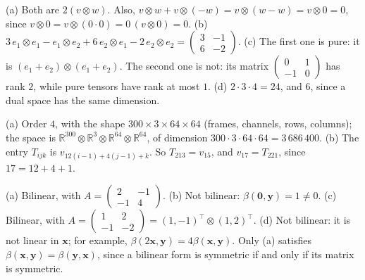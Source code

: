 \documentclass[11pt]{article}
\begin{document}
\begin{description}[leftmargin=0pt, itemsep=0.3em]
    \item[\ref{pr:tensor-rules}.] (a) Both are $2(v \otimes w)$. Also, $v \otimes w + v \otimes (-w) = v \otimes (w - w) = v \otimes 0 = 0$, since $v \otimes 0 = v \otimes (0 \cdot 0) = 0\,(v \otimes 0) = 0$. (b) $3\, e_1 \otimes e_1 - e_1 \otimes e_2 + 6\, e_2 \otimes e_1 - 2\, e_2 \otimes e_2 = \left(\begin{smallmatrix} 3 & -1 \\ 6 & -2 \end{smallmatrix}\right)$. (c) The first one is pure: it is $(e_1 + e_2) \otimes (e_1 + e_2)$. The second one is not: its matrix $\left(\begin{smallmatrix} 0 & 1 \\ -1 & 0 \end{smallmatrix}\right)$ has rank $2$, while pure tensors have rank at most $1$. (d) $2 \cdot 3 \cdot 4 = 24$, and $6$, since a dual space has the same dimension.
    \item[\ref{pr:tensor-shapes}.] (a) Order $4$, with the shape $300 \times 3 \times 64 \times 64$ (frames, channels, rows, columns); the space is $\mathbb{R}^{300} \otimes \mathbb{R}^3 \otimes \mathbb{R}^{64} \otimes \mathbb{R}^{64}$, of dimension $300 \cdot 3 \cdot 64 \cdot 64 = 3\,686\,400$. (b) The entry $T_{ijk}$ is $v_{12(i-1) + 4(j-1) + k}$. So $T_{213} = v_{15}$, and $v_{17} = T_{221}$, since $17 = 12 + 4 + 1$.
    \item[\ref{pr:bilinear-practice}.] (a) Bilinear, with $A = \left(\begin{smallmatrix} 2 & -1 \\ -1 & 4 \end{smallmatrix}\right)$. (b) Not bilinear: $\beta(\mathbf{0}, \mathbf{y}) = 1 \neq 0$. (c) Bilinear, with $A = \left(\begin{smallmatrix} 1 & 2 \\ -1 & -2 \end{smallmatrix}\right) = (1, -1)^\top \otimes (1, 2)^\top$. (d) Not bilinear: it is not linear in $\mathbf{x}$; for example, $\beta(2\mathbf{x}, \mathbf{y}) = 4\beta(\mathbf{x}, \mathbf{y})$. Only (a) satisfies $\beta(\mathbf{x}, \mathbf{y}) = \beta(\mathbf{y}, \mathbf{x})$, since a bilinear form is symmetric if and only if its matrix is symmetric.

\end{description}
\end{document}
